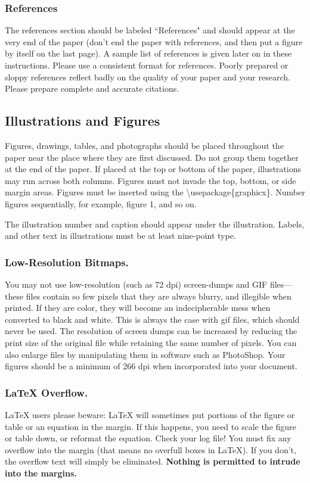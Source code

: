 \documentclass[letterpaper]{article}
\begin{document}
\subsubsection{References}
The references section should be labeled ``References" and should appear at the very end of the paper (don't end the paper with references, and then put a figure by itself on the last page). A sample list of references is given later on in these instructions. Please use a consistent format for references. Poorly prepared or sloppy references reflect badly on the quality of your paper and your research. Please prepare complete and accurate citations.

\subsection{Illustrations and Figures}
Figures, drawings, tables, and photographs should be placed throughout the paper near the place where they are first discussed. Do not group them together at the end of the paper. If placed at the top or bottom of the paper, illustrations may run across both columns. Figures must not invade the top, bottom, or side margin areas. Figures must be inserted using the \textbackslash usepackage\{graphicx\}. Number figures sequentially, for example, figure 1, and so on. 

The illustration number and caption should appear under the illustration. Labels, and other text in illustrations must be at least nine-point type. 

\subsubsection{Low-Resolution Bitmaps.}
You may not use low-resolution (such as 72 dpi) screen-dumps and GIF files---these files contain so few pixels that they are always blurry, and illegible when printed. If they are color, they will become an indecipherable mess when converted to black and white. This is always the case with gif files, which should never be used. The resolution of screen dumps can be increased by reducing the print size of the original file while retaining the same number of pixels. You can also enlarge files by manipulating them in software such as PhotoShop. Your figures should be a minimum of 266 dpi when incorporated into your document.

\subsubsection{\LaTeX{} Overflow.}
\LaTeX{} users please beware: \LaTeX{} will sometimes put portions of the figure or table or an equation in the margin. If this happens, you need to scale the figure or table down, or reformat the equation. Check your log file! You must fix any overflow into the margin (that means no overfull boxes in \LaTeX{}). If you don't, the overflow text will simply be eliminated. \textbf{Nothing is permitted to intrude into the margins.}
\end{document}
